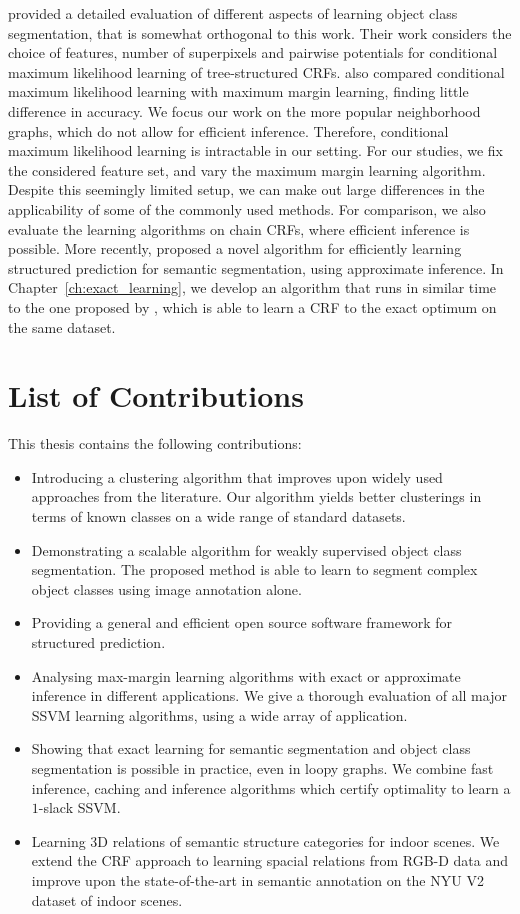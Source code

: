 \citet{nowozin2010parameter} provided a detailed evaluation of different aspects
of learning object class segmentation, that is somewhat orthogonal to this
work. Their work considers the choice of features, number of superpixels and
pairwise potentials for conditional maximum likelihood learning of
tree-structured CRFs.  \citet{nowozin2010parameter} also compared conditional
maximum likelihood learning with maximum margin learning, finding little
difference in accuracy.
We focus our work on the more popular neighborhood graphs, which do not allow
for efficient inference.  Therefore, conditional maximum likelihood learning is
intractable in our setting. For our studies, we fix the considered feature set,
and vary the maximum margin learning algorithm. Despite this seemingly limited
setup, we can make out large differences in the applicability of some of the
commonly used methods. For comparison, we also evaluate the learning algorithms
on chain CRFs, where efficient inference is possible.
More recently, \citet{lucchi2013learning} proposed a novel algorithm for
efficiently learning structured prediction for semantic segmentation, using
approximate inference. In Chapter~\ref{ch:exact_learning}, we develop an
algorithm that runs in similar time to the one proposed by
\citet{lucchi2013learning}, which is able to learn a CRF to the exact optimum on
the same dataset.


\section{List of Contributions}
This thesis contains the following contributions:
\begin{itemize}
\item Introducing a clustering algorithm that improves upon widely used
    approaches from the literature. Our algorithm yields better clusterings in
    terms of known classes on a wide range of standard datasets.
\item Demonstrating a scalable algorithm for weakly supervised object class
    segmentation.  The proposed method is able to learn to segment complex object
    classes using image annotation alone.
\item Providing a general and efficient open source software framework for
    structured prediction. 
\item Analysing max-margin learning algorithms with exact or approximate
    inference in different applications. We give a thorough evaluation of
    all major SSVM learning algorithms, using a wide array of application.
\item Showing that exact learning for semantic segmentation and object class
    segmentation is possible in practice, even in loopy graphs. We combine
    fast inference, caching and inference algorithms which certify optimality
    to learn a $1$-slack SSVM.
\item Learning 3D relations of semantic structure categories for indoor scenes.
    We extend the CRF approach to learning spacial relations from RGB-D data and
    improve upon the state-of-the-art in semantic annotation on the NYU V2 dataset
    of indoor scenes.
\end{itemize}


